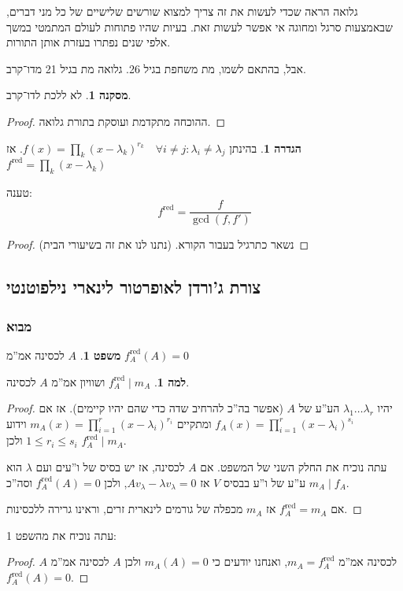 \documentclass[a4paper]{article}
\newcommand\co        {\colon}
\renewcommand\lg      {\lambda}
\theoremstyle{definition}
\newtheorem{Theorem}{משפט}
\newtheorem{definition}{הגדרה}
\newtheorem{Lemma}{למה}
\newtheorem{Collary}{מסקנה}
\newcommand\cola [1] {\begin{Collary}#1\end{Collary}}
\newcommand\theo  [1] {\begin{Theorem}#1\end{Theorem}}
\newcommand\defi  [1] {\begin{definition}#1\end{definition}}
\newcommand\lem   [1] {\begin{Lemma}#1\end{Lemma}}
\begin{document}
	גלואה הראה שכדי לעשות את זה צריך למצוא שורשים שלישיים של כל מני דברים, שבאמצעות סרגל ומחוגה אי אפשר לעשות זאת. בעיות שהיו פתוחות לעולם המתמטי במשך אלפי שנים נפתרו בעזרת אותן התורות. 
	
	אבל, בהתאם לשמו, מת משחפת בגיל 26. גלואה מת בגיל 21 מדו־קרב. 
	\cola{לא ללכת לדו־קרב. }\begin{proof}
		ההוכחה מתקדמת ועוסקת בתורת גלואה. 
	\end{proof}
	
	\defi{בהינתן $f(x) = \prod_{k}(x - \lg_k)^{r_k} \quad \forall i \neq j \co \lg_i \neq \lg_j$. אז $f^{\mathrm{red}} = \prod_{k}(x - \lg_k)$}
	
	טענה: 
	\[ f^{\mathrm{red}} = \frac{f}{\gcd(f, f')} \]
	\begin{proof}
		נשאר כתרגיל בעבור הקורא. (נתנו לנו את זה בשיעורי הבית)
	\end{proof}
	
	\subsection{צורת ג'ורדן לאופרטור לינארי נילפוטנטי}
	\subsubsection{מבוא}
	
	\theo{$A$ לכסינה אמ''מ $f_A^{\mathrm{red}}(A) = 0$}
	
	\lem{$f_A^{\mathrm{red}} \mid m_A$ ושוויון אמ''מ $A$ לכסינה. }
	
	\begin{proof}
		יהיו $\lg_1 \dots \lg_r$ הע''ע של $A$ (אפשר בה''כ להרחיב שדה כדי שהם יהיו קיימים). אז אם $f_A(x) = \prod_{i = 1}^{r}(x - \lg_i)^{s_i}$ ומתקיים $m_A(x) = \prod_{i = 1}^{r}(x - \lg_i)^{r_i}$ וידוע $1 \le r_i \le s_i$ ולכן $f_A^{\mathrm{red}} \mid m_A$. 
		
		עתה נוכיח את החלק השני של המשפט. אם $A$ לכסינה, אז יש בסיס של ו''עים ועם $\lg$ הוא ע''ע של ו''ע בבסיס $V$ אז $Av_\lg - \lg v_\lg = 0$, ולכן $f_A^{\mathrm{red}}(A) = 0$ וסה''כ $m_A \mid f_A$. 
		
		אם $f_A^{\mathrm{red}} = m_A$ אז $m_A$ מכפלה של גורמים לינארית זרים, וראינו גרירה ללכסינות. 
	\end{proof}
	
	עתה נוכיח את מהשפט 1: 
	\begin{proof}
		$A$ לכסינה אמ''מ $m_A = f_A^{\mathrm{red}}$, ואנחנו יודעים כי $m_A(A) = 0$ ולכן $A$ לכסינה אמ''מ $f_A^{\mathrm{red}}(A) = 0$. 
	\end{proof}
	
\end{document}
